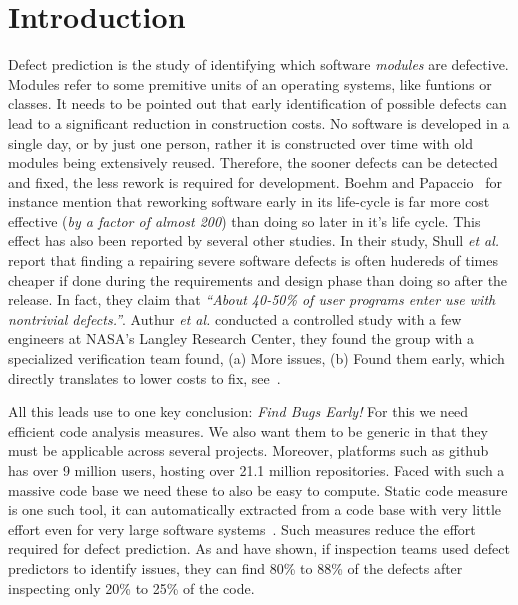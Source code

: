 \documentclass[12pt, journal, compsoc]{IEEEtran}
\begin{document}
\section{Introduction}
Defect prediction is the study of identifying which software \textit{modules} are defective. Modules refer to some premitive units of an operating systems, like funtions or classes. It needs to be pointed out that early identification of possible defects can lead to a significant reduction in construction costs. No software is developed in a single day, or by just one person, rather it is constructed over time with old modules being extensively reused. Therefore, the sooner defects can be detected and fixed, the less rework is required for development. Boehm and Papaccio~\cite{boehm88} for instance mention that reworking software early in its life-cycle is far more cost effective (\textit{by a factor of almost 200}) than doing so later in it's life cycle. This effect has also been reported by several other studies. In their study, Shull \textit{et al.}~\cite{shull2002we} report that finding a repairing severe software defects is often hudereds of times cheaper if done during the requirements and design phase than doing so after the release. In fact, they claim that \textit{``About 40-50\% of user programs enter use with
  nontrivial defects.''}. Authur \textit{et al.} \cite{arthur99} conducted a controlled study with a few engineers at NASA's Langley Research Center, they found the group with a specialized verification team found, (a) More issues, (b) Found them early, which directly translates to lower costs to fix, see~\cite{dabney2006predicting}. 

All this leads use to one key conclusion: \textit{Find Bugs Early!} For this we need efficient code analysis measures. We also want them to be generic in that they must be applicable across several projects. Moreover, platforms such as github has over 9 million users, hosting over 21.1 million repositories. Faced with such a massive code base we need these to also be easy to compute. Static code measure is one such tool, it can automatically extracted from a code base with very little effort even for very large software systems~\cite{nagappan2005static}. Such measures reduce the effort required for defect prediction. As \cite{tosun2010ai} and \cite{ostrand2004bugs} have shown, if inspection teams used defect predictors to identify  issues, they can find 80\% to 88\% of the defects after inspecting only 20\% to 25\% of the code.
\end{document}
